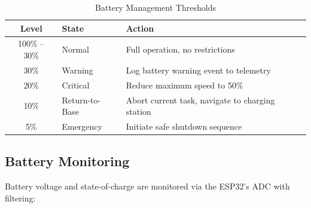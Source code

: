 \documentclass[11pt,letterpaper]{article}
\begin{document}
\begin{table}[H]
\centering
\caption{Battery Management Thresholds}
\begin{tabular}{|c|l|l|}
\hline
\textbf{Level} & \textbf{State} & \textbf{Action} \\
\hline
100\% -- 30\% & Normal & Full operation, no restrictions \\
\hline
30\% & Warning & Log battery warning event to telemetry \\
\hline
20\% & Critical & Reduce maximum speed to 50\% \\
\hline
10\% & Return-to-Base & Abort current task, navigate to charging station \\
\hline
5\% & Emergency & Initiate safe shutdown sequence \\
\hline
\end{tabular}
\end{table}

\subsection{Battery Monitoring}

Battery voltage and state-of-charge are monitored via the ESP32's ADC with filtering:
\end{document}
